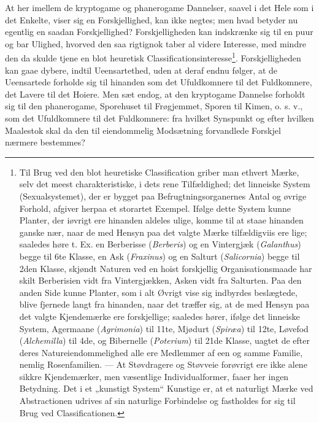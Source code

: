 \documentclass[11pt]{book}
\newcommand{\opage}[1]{\marginnote{\footnotesize\textit{[#1]}}}
\begin{document}
At her imellem de kryptogame og phanerogame Dannelser, saavel i det Hele
som i det Enkelte, viser sig en Forskjellighed, kan ikke negtes; men
hvad betyder nu egentlig en saadan Forskjellighed? Forskjelligheden kan
indskrænke sig til en puur og bar Ulighed, hvorved den saa rigtignok
taber al videre Interesse, med mindre den da skulde tjene en blot
heuretisk Classificationsinteresse\footnote{%
Til Brug ved den blot heuretiske Classification griber man ethvert
Mærke, selv det meest charakteristiske, i dets rene Tilfældighed; det
linneiske System (Sexualsystemet), der er bygget paa
Befrugtningsorganernes Antal og øvrige Forhold, afgiver herpaa et
storartet Exempel. Ifølge dette System kunne Planter, der iøvrigt ere
hinanden aldeles ulige, komme til at staae hinanden ganske nær, naar de
med Hensyn paa det valgte Mærke tilfældigviis ere lige; saaledes høre
t. Ex. en Berberisse (\textit{Berberis}) og en Vintergjæk
(\textit{Galanthus}) begge til 6te Klasse, en Ask (\textit{Fraxinus}) og
en Salturt (\textit{Salicornia}) begge til 2den Klasse, skjøndt Naturen
ved en hoist forskjellig Organisationsmaade har skilt Berberisien vidt
fra Vintergjækken, Asken vidt fra Salturten. Paa den anden
Side kunne Planter, som i alt Øvrigt vise sig indbyrdes beslægtede,
blive fjernede langt fra hinanden, naar det træffer sig, at de med
Hensyn paa det valgte Kjendemærke ere forskjellige; saaledes hører,
ifølge det linneiske System, Agermaane (\textit{Agrimonia}) til 11te,
Mjødurt (\textit{Spiræa}) til 12te, Løvefod (\textit{Alchemilla}) til
4de, og Bibernelle (\textit{Poterium}) til 21de Klasse, uagtet de efter
deres Natureiendommelighed alle ere Medlemmer af een og samme Familie,
nemlig Rosenfamilien. --- At Støvdragere og Støvveie forøvrigt ere ikke
alene sikkre Kjendemærker, men væsentlige Individualformer, faaer her
ingen Betydning. Det i et „kunstigt System“ Kunstige er, at et naturligt
Mærke ved Abstractionen udrives af sin naturlige Forbindelse og
fastholdes for sig til Brug ved Classificationen.
}. Forskjelligheden kan gaae dybere, indtil
\opage{293} \setcounter{footnote}{0}%
Ueensartethed, uden at deraf endnu følger, at de Ueensartede forholde
sig til hinanden som det Ufuldkomnere til det Fuldkomnere, det Lavere
til det Hoiere. Men sæt endog, at den kryptogame Dannelse forholdt sig
til den phanerogame, Sporehuset til Frøgjemmet, Sporen til Kimen,
o. s. v., som det Ufuldkomnere til det Fuldkomnere: fra hvilket
Synspunkt og efter hvilken Maalestok skal da den til eiendommelig
Modsætning forvandlede Forskjel nærmere bestemmes?
\end{document}
